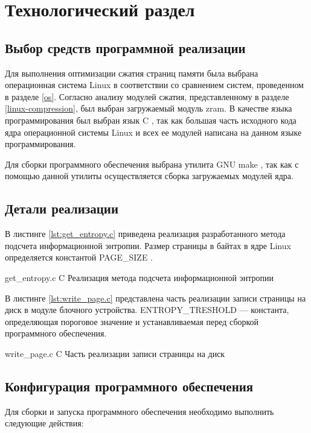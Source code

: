 \chapter{Технологический раздел}

\section{Выбор средств программной реализации}

Для выполнения оптимизации сжатия страниц памяти была выбрана операционная система Linux в соответствии со сравнением систем, проведенном в разделе \ref{os}. Согласно анализу модулей сжатия, представленному в разделе \ref{linux-compression}, был выбран загружаемый модуль zram. В качестве языка программирования был выбран язык C \cite{c}, так как большая часть исходного кода ядра операционной системы Linux и всех ее модулей написана на данном языке программирования.

Для сборки программного обеспечения выбрана утилита GNU make \cite{make}, так как с помощью данной утилиты осуществляется сборка загружаемых модулей ядра.

\section{Детали реализации}

В листинге \ref{lst:get_entropy.c} приведена реализация разработанного метода подсчета информационной энтропии. Размер страницы в байтах в ядре Linux определяется константой PAGE\_SIZE \cite{block-file}.

    {get_entropy.c}
    {C}
    {Реализация метода подсчета информационной энтропии}

В листинге \ref{lst:write_page.c} представлена часть реализации записи страницы на диск в модуле блочного устройства. ENTROPY\_TRESHOLD --- константа, определяющая пороговое значение и устанавливаемая перед сборкой программного обеспечения.

    {write_page.c}
    {C}
    {Часть реализации записи страницы на диск}

\section{Конфигурация программного обеспечения}

Для сборки и запуска программного обеспечения необходимо выполнить следующие действия:

